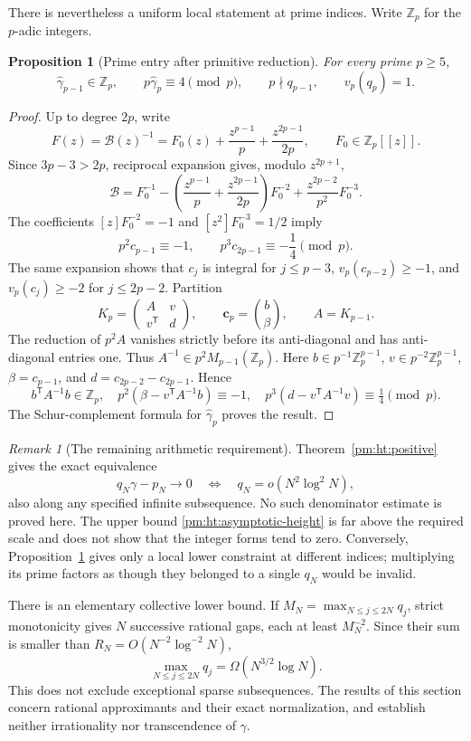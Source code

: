 \documentclass[11pt,a4paper]{article}
\newcommand{\Z}{\mathbb Z}
\newtheorem{proposition}[theorem]{Proposition}
\theoremstyle{definition}
\theoremstyle{remark}
\newtheorem{remark}[theorem]{Remark}
\numberwithin{equation}{section}
\begin{document}
There is nevertheless a uniform local statement at prime indices.
Write $\Z_p$ for the $p$-adic integers.
\begin{proposition}[Prime entry after primitive reduction]\label{pm:ht:prime}
For every prime $p\geq5$,
\[
 \widehat\gamma_{p-1}\in\Z_p,\qquad p\widehat\gamma_p\equiv4\pmod p,
 \qquad p\nmid q_{p-1},\qquad v_p(q_p)=1.
\]
\end{proposition}
\begin{proof}
Up to degree $2p$, write
\[
 F(z)=\mathscr B(z)^{-1}=F_0(z)+\frac{z^{p-1}}p+\frac{z^{2p-1}}{2p},
 \qquad F_0\in\Z_p[[z]].
\]
Since $3p-3>2p$, reciprocal expansion gives, modulo $z^{2p+1}$,
\[
 \mathscr B=F_0^{-1}-\left(\frac{z^{p-1}}p+
      \frac{z^{2p-1}}{2p}\right)F_0^{-2}
       +\frac{z^{2p-2}}{p^2}F_0^{-3}.
\]
The coefficients $[z]F_0^{-2}=-1$ and
$[z^2]F_0^{-3}=1/2$ imply
\[
 p^2c_{p-1}\equiv-1,\qquad
 p^3c_{2p-1}\equiv-\frac14\pmod p.
\]
The same expansion shows that $c_j$ is integral for $j\leq p-3$,
$v_p(c_{p-2})\geq-1$, and $v_p(c_j)\geq-2$ for $j\leq2p-2$.
Partition
\[
 K_p=\begin{pmatrix}A&v\\v^{\mathsf T}&d\end{pmatrix},
 \qquad\boldsymbol c_p=\binom{b}{\beta},\qquad A=K_{p-1}.
\]
The reduction of $p^2A$ vanishes strictly before its anti-diagonal
and has anti-diagonal entries one.  Thus $A^{-1}\in p^2M_{p-1}(\Z_p)$.
Here $b\in p^{-1}\Z_p^{p-1}$, $v\in p^{-2}\Z_p^{p-1}$,
$\beta=c_{p-1}$, and $d=c_{2p-2}-c_{2p-1}$.  Hence
\[
 b^{\mathsf T}A^{-1}b\in\Z_p,\quad
 p^2(\beta-v^{\mathsf T}A^{-1}b)\equiv-1,\quad
 p^3(d-v^{\mathsf T}A^{-1}v)\equiv\tfrac14\pmod p.
\]
The Schur-complement formula for $\widehat\gamma_p$ proves the result.
\end{proof}

\begin{remark}[The remaining arithmetic requirement]\label{pm:ht:scope}
Theorem~\ref{pm:ht:positive} gives the exact equivalence
\[
 q_N\gamma-p_N\longrightarrow0
 \quad\Longleftrightarrow\quad
 q_N=o(N^2\log^2N),
\]
also along any specified infinite subsequence.  No such denominator
estimate is proved here.  The upper bound
\eqref{pm:ht:asymptotic-height} is far above the required scale and
does not show that the integer forms tend to zero.  Conversely,
Proposition~\ref{pm:ht:prime} gives only a local lower constraint at
different indices; multiplying its prime factors as though they
belonged to a single $q_N$ would be invalid.

There is an elementary collective lower bound.  If
$M_N=\max_{N\leq j\leq2N}q_j$, strict monotonicity gives $N$
successive rational gaps, each at least $M_N^{-2}$.  Since their
sum is smaller than $R_N=O(N^{-2}\log^{-2}N)$,
\[
 \max_{N\leq j\leq2N}q_j=\Omega(N^{3/2}\log N).
\]
This does not exclude exceptional sparse subsequences.  The results
of this section concern rational approximants and their exact
normalization, and establish neither irrationality nor transcendence
of $\gamma$.
\end{remark}
\end{document}
